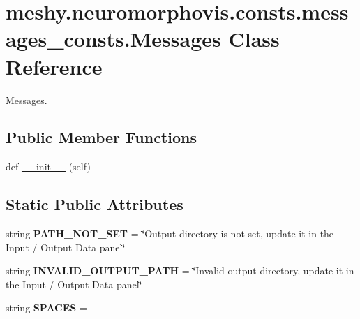 \hypertarget{classmeshy_1_1neuromorphovis_1_1consts_1_1messages__consts_1_1Messages}{}\section{meshy.\+neuromorphovis.\+consts.\+messages\+\_\+consts.\+Messages Class Reference}
\label{classmeshy_1_1neuromorphovis_1_1consts_1_1messages__consts_1_1Messages}


\hyperlink{classmeshy_1_1neuromorphovis_1_1consts_1_1messages__consts_1_1Messages}{Messages}.  


\subsection*{Public Member Functions}
\begin{DoxyCompactItemize}
\item 
def \hyperlink{classmeshy_1_1neuromorphovis_1_1consts_1_1messages__consts_1_1Messages_a3e717040a49a567b95a560abead5437e}{\+\_\+\+\_\+init\+\_\+\+\_\+} (self)\hypertarget{classmeshy_1_1neuromorphovis_1_1consts_1_1messages__consts_1_1Messages_a3e717040a49a567b95a560abead5437e}{}\label{classmeshy_1_1neuromorphovis_1_1consts_1_1messages__consts_1_1Messages_a3e717040a49a567b95a560abead5437e}

\end{DoxyCompactItemize}
\subsection*{Static Public Attributes}
\begin{DoxyCompactItemize}
\item 
string {\bfseries P\+A\+T\+H\+\_\+\+N\+O\+T\+\_\+\+S\+ET} = \char`\"{}Output directory is not set, update it in the Input / Output Data panel\char`\"{}\hypertarget{classmeshy_1_1neuromorphovis_1_1consts_1_1messages__consts_1_1Messages_adf0afa03ecd2d77d56174b8383af9091}{}\label{classmeshy_1_1neuromorphovis_1_1consts_1_1messages__consts_1_1Messages_adf0afa03ecd2d77d56174b8383af9091}

\item 
string {\bfseries I\+N\+V\+A\+L\+I\+D\+\_\+\+O\+U\+T\+P\+U\+T\+\_\+\+P\+A\+TH} = \char`\"{}Invalid output directory, update it in the Input / Output Data panel\char`\"{}\hypertarget{classmeshy_1_1neuromorphovis_1_1consts_1_1messages__consts_1_1Messages_aba071ba9ff78db688cc8e2503750b746}{}\label{classmeshy_1_1neuromorphovis_1_1consts_1_1messages__consts_1_1Messages_aba071ba9ff78db688cc8e2503750b746}

\item 
string {\bfseries S\+P\+A\+C\+ES} = \textquotesingle{} \textquotesingle{}\hypertarget{classmeshy_1_1neuromorphovis_1_1consts_1_1messages__consts_1_1Messages_a3edfb09baad88646a50ae1307ec98c8b}{}\label{classmeshy_1_1neuromorphovis_1_1consts_1_1messages__consts_1_1Messages_a3edfb09baad88646a50ae1307ec98c8b}

\end{DoxyCompactItemize}


